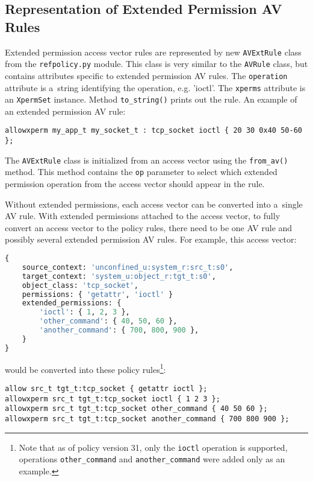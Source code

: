 \subsection{Representation of Extended Permission AV Rules}
Extended permission access vector rules are represented by new
\texttt{AVExtRule} class from the \texttt{refpolicy.py} module. This class is
very similar to the \texttt{AVRule} class, but contains attributes specific to
extended permission AV rules. The \texttt{operation} attribute is a~string
identifying the operation, e.g. 'ioctl'. The \texttt{xperms} attribute is an
\texttt{XpermSet} instance. Method \texttt{to\_string()} prints out the rule.
An example of an extended permission AV rule:
\begin{lstlisting}
allowxperm my_app_t my_socket_t : tcp_socket ioctl { 20 30 0x40 50-60 };
\end{lstlisting}

The \texttt{AVExtRule} class is initialized from an access vector using the
\texttt{from\_av()} method. This method contains the \texttt{op} parameter to
select which extended permission operation from the access vector should appear
in the rule.

Without extended permissions, each access vector can be converted into a~single
AV rule. With extended permissions attached to the access vector, to fully
convert an access vector to the policy rules, there need to be one AV rule and
possibly several extended permission AV rules. For example, this access vector:

\begin{lstlisting}[language=Python]
{
    source_context: 'unconfined_u:system_r:src_t:s0',
    target_context: 'system_u:object_r:tgt_t:s0',
    object_class: 'tcp_socket',
    permissions: { 'getattr', 'ioctl' }
    extended_permissions: {
        'ioctl': { 1, 2, 3 },
        'other_command': { 40, 50, 60 },
        'another_command': { 700, 800, 900 },
    }
}
\end{lstlisting}
would be converted into these policy rules\footnote{Note that as of policy
version 31, only the \texttt{ioctl} operation is supported, operations
\texttt{other\_command} and \texttt{another\_command} were added only as an
example.}:
\begin{lstlisting}
allow src_t tgt_t:tcp_socket { getattr ioctl };
allowxperm src_t tgt_t:tcp_socket ioctl { 1 2 3 };
allowxperm src_t tgt_t:tcp_socket other_command { 40 50 60 };
allowxperm src_t tgt_t:tcp_socket another_command { 700 800 900 };
\end{lstlisting}

